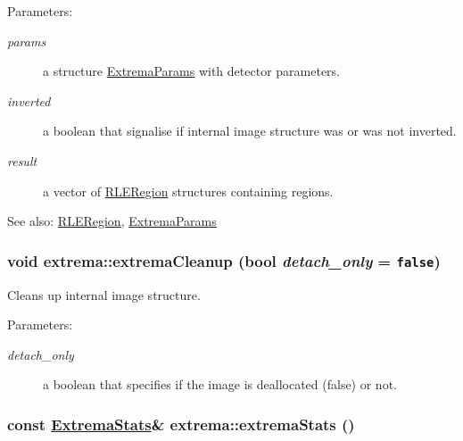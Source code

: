 \begin{Desc}
\item[Parameters:]
\begin{description}
\item[{\em params}]a structure \hyperlink{structextrema_1_1ExtremaParams}{Extrema\-Params} with detector parameters. \item[{\em inverted}]a boolean that signalise if internal image structure was or was not inverted. \item[{\em result}]a vector of \hyperlink{structextrema_1_1RLERegion}{RLERegion} structures containing regions.\end{description}
\end{Desc}
\begin{Desc}
\item[See also:]\hyperlink{structextrema_1_1RLERegion}{RLERegion}, \hyperlink{structextrema_1_1ExtremaParams}{Extrema\-Params} \end{Desc}
\hypertarget{namespaceextrema_5abe959d6add34bf6baa0c2024340a68}{
\subsubsection[extremaCleanup]{\setlength{\rightskip}{0pt plus 5cm}void extrema::extrema\-Cleanup (bool {\em detach\_\-only} = {\tt false})}}
\label{namespaceextrema_5abe959d6add34bf6baa0c2024340a68}


Cleans up internal image structure. 

\begin{Desc}
\item[Parameters:]
\begin{description}
\item[{\em detach\_\-only}]a boolean that specifies if the image is deallocated (false) or not. \end{description}
\end{Desc}
\hypertarget{namespaceextrema_b329cf4824c4a326bb4ead6855531c76}{
\subsubsection[extremaStats]{\setlength{\rightskip}{0pt plus 5cm}const \hyperlink{structextrema_1_1ExtremaStats}{Extrema\-Stats}\& extrema::extrema\-Stats ()}}
\label{namespaceextrema_b329cf4824c4a326bb4ead6855531c76}


